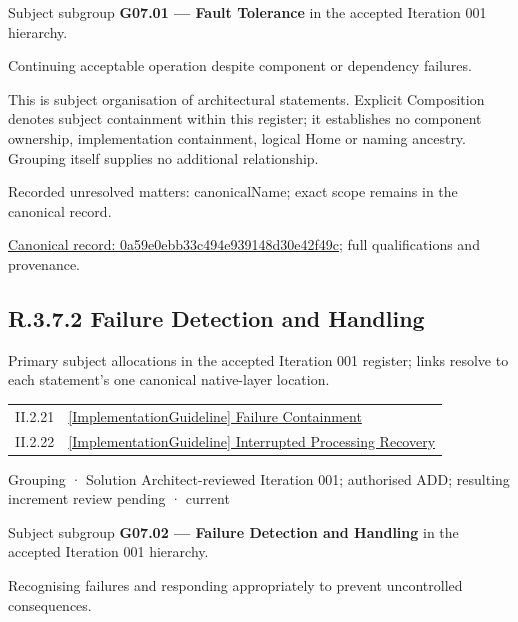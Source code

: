 Subject subgroup \textbf{G07.01 — Fault Tolerance} in the accepted Iteration 001 hierarchy.



Continuing acceptable operation despite component or dependency failures.



This is subject organisation of architectural statements. Explicit Composition denotes subject containment within this register; it establishes no component ownership, implementation containment, logical Home or naming ancestry. Grouping itself supplies no additional relationship.


{\small Recorded unresolved matters: canonicalName; exact scope remains in the canonical record.}\par
{\footnotesize \href{../../../../continuum/grouping/0a59e0ebb33c494e939148d30e42f49c.md}{Canonical record: 0a59e0ebb33c494e939148d30e42f49c}; full qualifications and provenance.}\par
\subsection*{R.3.7.2 Failure Detection and Handling}
\label{navigation:R.3.7.2}

Primary subject allocations in the accepted Iteration 001 register; links resolve to each statement’s one canonical native-layer location.\par
\begin{longtable}{p{.22\linewidth}p{.73\linewidth}}
II.2.21 & \hyperref[element:93e40f54c22846538d91dc901ee34633]{[ImplementationGuideline] Failure Containment} \\
II.2.22 & \hyperref[element:6ca05ae8b3b34c1493ecdb48cfda1979]{[ImplementationGuideline] Interrupted Processing Recovery} \\
\end{longtable}
\label{element:e9804b6dea5c4e1db80be1925463786f}
{\small Grouping · Solution Architect-reviewed Iteration 001; authorised ADD; resulting increment review pending · current}\par

Subject subgroup \textbf{G07.02 — Failure Detection and Handling} in the accepted Iteration 001 hierarchy.



Recognising failures and responding appropriately to prevent uncontrolled consequences.



